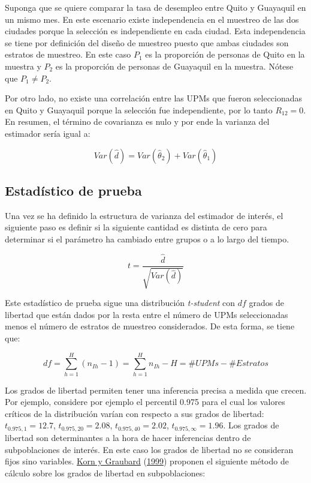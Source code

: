 \documentclass[
  12pt,
  spanish,
]{book}
\begin{document}
Suponga que se quiere comparar la tasa de desempleo entre Quito y Guayaquil en un mismo mes. En este escenario existe independencia en el muestreo de las dos ciudades porque la selección es independiente en cada ciudad. Esta independencia se tiene por definición del diseño de muestreo puesto que ambas ciudades son estratos de muestreo. En este caso \(P_1\) es la proporción de personas de Quito en la muestra y \(P_2\) es la proporción de personas de Guayaquil en la muestra. Nótese que \(P_1 \neq P_2\).

Por otro lado, no existe una correlación entre las UPMs que fueron seleccionadas en Quito y Guayaquil porque la selección fue independiente, por lo tanto \(R_{12} = 0\). En resumen, el término de covarianza es nulo y por ende la varianza del estimador sería igual a:

\[
Var(\hat{d}) 
= Var(\hat{\theta}_2) + Var(\hat{\theta}_1)
\]

\hypertarget{estaduxedstico-de-prueba}{%
\subsection{Estadístico de prueba}\label{estaduxedstico-de-prueba}}

Una vez se ha definido la estructura de varianza del estimador de interés, el siguiente paso es definir si la siguiente cantidad es distinta de cero para determinar si el parámetro ha cambiado entre grupos o a lo largo del tiempo.

\[
t = \frac{\hat{d}}{\sqrt{Var(\hat{d})}}
\]

Este estadístico de prueba sigue una distribución \emph{t-student} con \(df\) grados de libertad que están dados por la resta entre el número de UPMs seleccionadas menos el número de estratos de muestreo considerados. De esta forma, se tiene que:

\[
df = \sum_{h=1}^H (n_{Ih} - 1) = \sum_{h=1}^H n_{Ih} - H = \#UPMs - \#Estratos
\]

Los grados de libertad permiten tener una inferencia precisa a medida que crecen. Por ejemplo, considere por ejemplo el percentil 0.975 para el cual los valores críticos de la distribución varían con respecto a sus grados de libertad: \(t_{0.975, 1}=12.7\), \(t_{0.975, 20}=2.08\), \(t_{0.975, 40}=2.02\), \(t_{0.975, \infty}=1.96\). Los grados de libertad son determinantes a la hora de hacer inferencias dentro de subpoblaciones de interés. En este caso los grados de libertad no se consideran fijos sino variables. \protect\hyperlink{ref-Korn_Graubard_1999}{Korn y Graubard} (\protect\hyperlink{ref-Korn_Graubard_1999}{1999}) proponen el siguiente método de cálculo sobre los grados de libertad en subpoblaciones:
\end{document}

